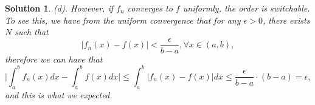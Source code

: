 \documentclass[6pt]{article}
\newtheorem{solution}{Solution}
\numberwithin{equation}{section}
\begin{document}
\begin{enumerate}
\begin{solution}
(d).  However, if $f_n$ converges to $f$ uniformly, the order is switchable.  To see this, we have from the uniform convergence that for any $\epsilon>0$, there exists $N$ such that
\[|f_n(x)-f(x)|<\frac{\epsilon}{b-a},\forall x\in(a,b),\]
therefore we can have that
\[\Big| \int_a^b f_n(x)dx-\int_a^bf(x)dx \Big|\leq \int_a^b |f_n(x)-f(x)|dx\leq \frac{\epsilon}{b-a}\cdot (b-a)=\epsilon,\]
and this is what we expected.
\end{solution}


\end{enumerate}
\end{document}
